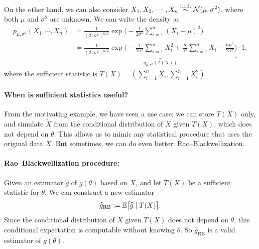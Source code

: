 \documentclass[11pt,letterpaper]{article}
\numberwithin{assumption}{lecture}
\numberwithin{theorem}{lecture}
\numberwithin{proposition}{lecture}
\numberwithin{lemma}{lecture}
\numberwithin{claim}{lecture}
\numberwithin{corollary}{lecture}
\numberwithin{definition}{lecture}
\numberwithin{conjecture}{lecture}
\numberwithin{remark}{lecture}
\numberwithin{example}{lecture}
\numberwithin{equation}{lecture}
\begin{document}
On the other hand, we can also consider $X_1, X_2, \cdots, X_n \overset{\mathrm{i.i.d.}}{\sim} \mathcal{N} (\mu, \sigma^2)$, where both $\mu$ and $\sigma^2$ are unknown. We can write the density as
\begin{align*}
  p_{\mu, \sigma^2} (X_1, \cdots, X_n) &= \frac{1}{(2\pi \sigma^2)^{n/2}} \exp \Big( - \frac{1}{2\sigma^2} \sum_{i=1}^n (X_i - \mu)^2 \Big)\\
  &=  \underbrace{\frac{1}{(2\pi \sigma^2)^{n/2}} \exp \Big( - \frac{1}{2 \sigma^2} \sum_{i=1}^n X_i^2 + \frac{\mu}{\sigma^2} \sum_{i=1}^n X_i - \frac{n \mu^2}{2 \sigma^2}  \Big)}_{g_{\mu, \sigma^2} (T (X))} \cdot 1,
\end{align*}
where the sufficient statistic is $T(X) = (\sum_{i=1}^n X_i, \sum_{i=1}^n X_i^2)$.

\paragraph{When is sufficient statistics useful?} From the motivating example, we have seen a use case: we can store $T(X)$ only, and simulate $\widetilde{X}$ from the conditional distribution of $X$ given $T(X)$, which does not depend on $\theta$. This allows us to mimic any statistical procedure that uses the original data $X$. But sometimes, we can do even better: Rao--Blackwellization.

\paragraph{Rao--Blackwellization procedure:} Given an estimator $\widehat{g}$ of $g(\theta)$ based on $X$, and let $T(X)$ be a sufficient statistic for $\theta$. We can construct a new estimator
\begin{align*}
  \widehat{g}_{\mathrm{RB}} := {\mathbb{E}} \big[ \widehat{g} \mid T (X) \big].
\end{align*}
Since the conditional distribution of $X$ given $T(X)$ does not depend on $\theta$, this conditional expectation is computable without knowing $\theta$. So $\widehat{g}_{\mathrm{RB}}$ is a valid estimator of $g(\theta)$.
\end{document}
